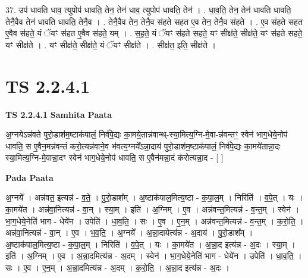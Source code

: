 \documentclass[17pt]{extarticle}
\begin{document}
37. उप॑ धावति धाव॒ त्युपोप॑ धावति॒ तेन॒ तेन॑ धाव॒ त्युपोप॑ धावति॒ तेन॑ । . धा॒व॒ति॒ तेन॒ तेन॑ धावति धावति॒ तेनै॒वैव तेन॑ धावति धावति॒ तेनै॒व । . तेनै॒वैव तेन॒ तेनै॒व स॑हते सहत ए॒व तेन॒ तेनै॒व स॑हते । . ए॒व स॑हते सहत ए॒वैव स॑हते॒ यं ॅयꣳ स॑हत ए॒वैव स॑हते॒ यम् । . स॒ह॒ते॒ यं ॅयꣳ स॑हते सहते॒ यꣳ सीक्ष॑ते॒ सीक्ष॑ते॒ यꣳ स॑हते सहते॒ यꣳ सीक्ष॑ते । . यꣳ सीक्ष॑ते॒ सीक्ष॑ते॒ यं ॅयꣳ सीक्ष॑ते । . सीक्ष॑त॒ इति॒ सीक्ष॑ते । \newline
\pagebreak
{}

\section{ TS 2.2.4.1 }

\textbf{TS 2.2.4.1 } \newline
\textbf{Samhita Paata} \newline

अ॒ग्नयेऽन्न॑वते पुरो॒डाश॑म॒ष्टाक॑पालं॒ निर्व॑पे॒द्यः का॒मये॒तान्न॑वान्थ्-स्या॒मित्य॒ग्नि-मे॒वा-न्न॑वन्तꣳ॒॒ स्वेन॑ भाग॒धेये॒नोप॑ धावति॒ स ए॒वैन॒मन्न॑वन्तं करो॒त्यन्न॑वाने॒व भ॑वत्य॒ग्नये᳚ऽन्ना॒दाय॑ पुरो॒डाश॑म॒ष्टाक॑पालं॒ निर्व॑पे॒द्यः का॒मये॑तान्ना॒दः स्या॒मित्य॒ग्नि-मे॒वान्ना॒दꣳ स्वेन॑ भाग॒धेये॒नोप॑ धावति॒ स ए॒वैन॑मन्ना॒दं क॑रोत्यन्ना॒द - [  ] \newline

\textbf{Pada Paata} \newline

अ॒ग्नये᳚ । अन्न॑वत॒ इत्यन्न॑ - व॒ते॒ । पु॒रो॒डाश᳚म् । अ॒ष्टाक॑पाल॒मित्य॒ष्टा - क॒पा॒ल॒म् । निरिति॑ । व॒पे॒त् । यः । का॒मये॑त । अन्न॑वा॒नित्यन्न॑ - वा॒न् । स्या॒म् । इति॑ । अ॒ग्निम् । ए॒व । अन्न॑वन्त॒मित्यन्न॑ - व॒न्त॒म् । स्वेन॑ । भा॒ग॒धेये॒नेति॑ भाग - धेये॑न । उपेति॑ । धा॒व॒ति॒ । सः । ए॒व । ए॒न॒म् । अन्न॑वन्त॒मित्यन्न॑ - व॒न्त॒म् । क॒रो॒ति॒ । अन्न॑वा॒नित्यन्न॑ - वा॒न् । ए॒व । भ॒व॒ति॒ । अ॒ग्नये᳚ । अ॒न्ना॒दायेत्य॑न्न - अ॒दाय॑ । पु॒रो॒डाश᳚म् । अ॒ष्टाक॑पाल॒मित्य॒ष्टा - क॒पा॒ल॒म् । निरिति॑ । व॒पे॒त् । यः । का॒मये॑त । अ॒न्ना॒द इत्य॑न्न - अ॒दः । स्या॒म् । इति॑ । अ॒ग्निम् । ए॒व । अ॒न्ना॒दमित्य॑न्न - अ॒दम् । स्वेन॑ । भा॒ग॒धेये॒नेति॑ भाग - धेये॑न । उपेति॑ । धा॒व॒ति॒ । सः । ए॒व । ए॒न॒म् । अ॒न्ना॒दमित्य॑न्न - अ॒दम् । क॒रो॒ति॒ । अ॒न्ना॒द इत्य॑न्न - अ॒दः ।  \newline
\end{document}
